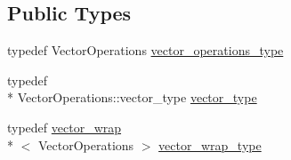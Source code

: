 \subsection*{Public Types}
\begin{DoxyCompactItemize}
\item 
typedef Vector\-Operations \hyperlink{structnumerical__algos_1_1detail_1_1vectors__arr__wrap__static_a4de11cdce0c015a0b78f2171fd8680c0}{vector\-\_\-operations\-\_\-type}
\item 
typedef \\*
Vector\-Operations\-::vector\-\_\-type \hyperlink{structnumerical__algos_1_1detail_1_1vectors__arr__wrap__static_ae21a4b4f6af2d7a042e02f41234c1ea0}{vector\-\_\-type}
\item 
typedef \hyperlink{structnumerical__algos_1_1detail_1_1vector__wrap}{vector\-\_\-wrap}\\*
$<$ Vector\-Operations $>$ \hyperlink{structnumerical__algos_1_1detail_1_1vectors__arr__wrap__static_a1c79a723b24f6d9411ccbd74ae94dde8}{vector\-\_\-wrap\-\_\-type}
\end{DoxyCompactItemize}

